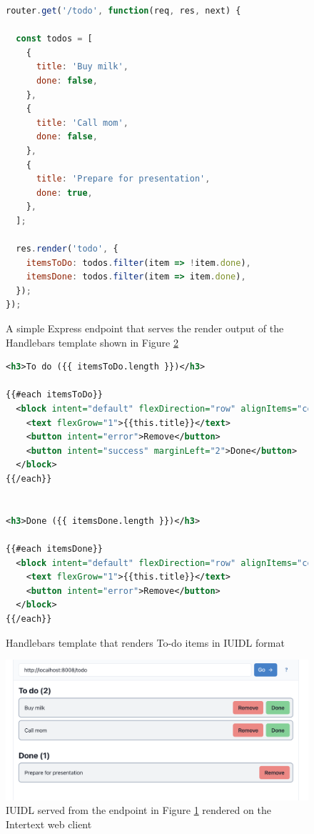 \begin{figure}
\begin{minipage}{\linewidth}
\begin{lstlisting}[language=javascript]
router.get('/todo', function(req, res, next) {

  const todos = [
    {
      title: 'Buy milk',
      done: false,
    },
    {
      title: 'Call mom',
      done: false,
    },
    {
      title: 'Prepare for presentation',
      done: true,
    },
  ];

  res.render('todo', {
    itemsToDo: todos.filter(item => !item.done),
    itemsDone: todos.filter(item => item.done),
  });
});
\end{lstlisting}
\end{minipage}
\caption{A simple Express endpoint that serves the render output of the Handlebars template shown in Figure \ref{fig:todos_template}}%
\label{fig:todos_js}%
\end{figure}

\begin{figure}
\begin{minipage}{\linewidth}
\begin{lstlisting}[language=xml]
<h3>To do ({{ itemsToDo.length }})</h3>

{{#each itemsToDo}}
  <block intent="default" flexDirection="row" alignItems="center" paddingLeft="4">
    <text flexGrow="1">{{this.title}}</text>
    <button intent="error">Remove</button>
    <button intent="success" marginLeft="2">Done</button>
  </block>
{{/each}}


<h3>Done ({{ itemsDone.length }})</h3>

{{#each itemsDone}}
  <block intent="default" flexDirection="row" alignItems="center" paddingLeft="4">
    <text flexGrow="1">{{this.title}}</text>
    <button intent="error">Remove</button>
  </block>
{{/each}}
\end{lstlisting}
\end{minipage}
\caption{Handlebars template that renders To-do items in IUIDL format}%
\label{fig:todos_template}%
\end{figure}

\begin{figure}
  \centering
  \includegraphics[width=13cm]{thesis/paper/images/todos.png}
  \caption{IUIDL served from the endpoint in Figure \ref{fig:todos_js} rendered on the Intertext web client}%
  \label{fig:todos_output}%
\end{figure}

